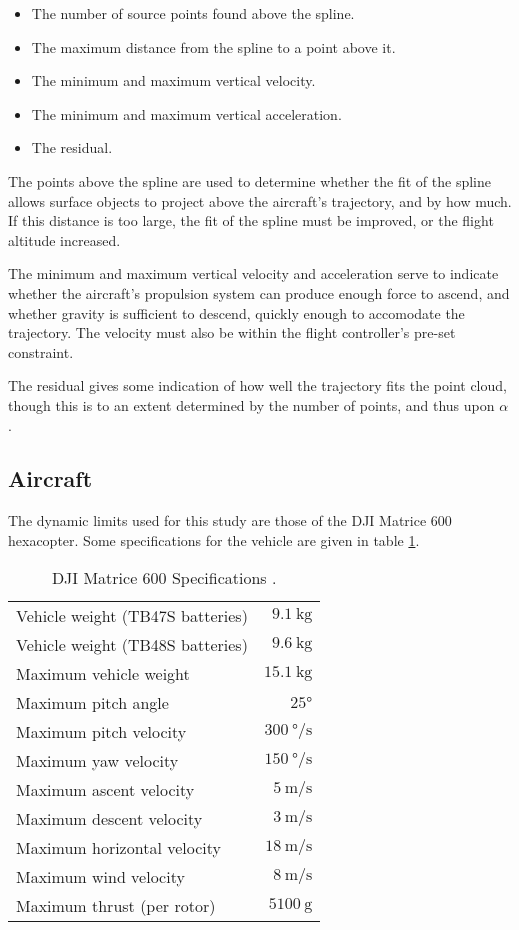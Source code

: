 \documentclass[doc]{apa6}
\begin{document}
\begin{itemize}
\item The number of source points found above the spline.
\item The maximum distance from the spline to a point above it.
\item The minimum and maximum vertical velocity.
\item The minimum and maximum vertical acceleration.
\item The residual.
\end{itemize}

The points above the spline are used to determine whether the fit of the spline allows surface objects to project above the aircraft's trajectory, and by how much. If this distance is too large, the fit of the spline must be improved, or the flight altitude increased.

The minimum and maximum vertical velocity and acceleration serve to indicate whether the aircraft's propulsion system can produce enough force to ascend, and whether gravity is sufficient to descend, quickly enough to accomodate the trajectory. The velocity must also be within the flight controller's pre-set constraint.

The residual gives some indication of how well the trajectory fits the point cloud, though this is to an extent determined by the number of points, and thus upon $\alpha$.

\subsection{Aircraft}

The dynamic limits used for this study are those of the DJI Matrice 600 hexacopter. Some specifications for the vehicle are given in table \ref{table:djispecs}.

\begin{table}
\begin{center}
\begin{tabular}{ l r }
\hline
Vehicle weight (TB47S batteries) & $\SI{9.1}\kg$ \\ 
Vehicle weight (TB48S batteries) & $\SI{9.6}\kg$ \\
Maximum vehicle weight & $\SI{15.1}\kg$ \\
Maximum pitch angle & $\ang{25}$ \\
Maximum pitch velocity & $\SI{300}{\degree\per\second}$ \\
Maximum yaw velocity & $\SI{150}{\degree\per\second}$ \\
Maximum ascent velocity & $\SI{5}{\metre\per\second}$ \\
Maximum descent velocity & $\SI{3}{\metre\per\second}$ \\
Maximum horizontal velocity & $\SI{18}{\metre\per\second}$ \\
Maximum wind velocity & $\SI{8}{\metre\per\second}$ \\
Maximum thrust (per rotor) & $\SI{5100}{\g}$ \\
\hline
\end{tabular}
\end{center}
\caption{DJI Matrice 600 Specifications \cite{DJI2017}.}
\label{table:djispecs}
\end{table}
\end{document}
